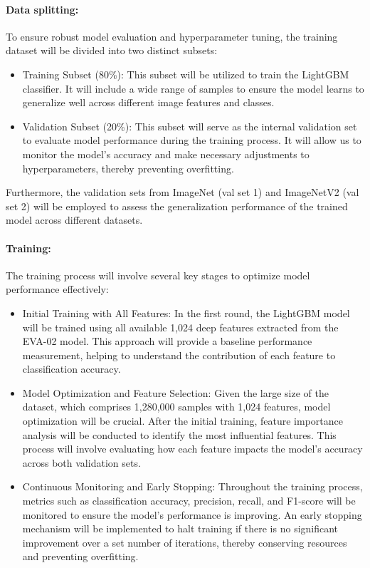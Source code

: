 \documentclass[a4paper,11pt]{article}
\begin{document}
\paragraph{Data splitting:}  
To ensure robust model evaluation and hyperparameter tuning, the training dataset will be divided into two distinct subsets:
\begin{itemize}
    \item Training Subset (80\%): This subset will be utilized to train the LightGBM classifier. It will include a wide range of samples to ensure the model learns to generalize well across different image features and classes.
    \item Validation Subset (20\%): This subset will serve as the internal validation set to evaluate model performance during the training process. It will allow us to monitor the model's accuracy and make necessary adjustments to hyperparameters, thereby preventing overfitting. 
\end{itemize}
Furthermore, the validation sets from ImageNet (val set 1) and ImageNetV2 (val set 2) will be employed to assess the generalization performance of the trained model across different datasets.

\paragraph{Training:}  
The training process will involve several key stages to optimize model performance effectively:
\begin{itemize}
    \item Initial Training with All Features: In the first round, the LightGBM model will be trained using all available 1,024 deep features extracted from the EVA-02 model. This approach will provide a baseline performance measurement, helping to understand the contribution of each feature to classification accuracy.
    \item Model Optimization and Feature Selection: Given the large size of the dataset, which comprises 1,280,000 samples with 1,024 features, model optimization will be crucial. After the initial training, feature importance analysis will be conducted to identify the most influential features. This process will involve evaluating how each feature impacts the model's accuracy across both validation sets.
    \item Continuous Monitoring and Early Stopping: Throughout the training process, metrics such as classification accuracy, precision, recall, and F1-score will be monitored to ensure the model's performance is improving. An early stopping mechanism will be implemented to halt training if there is no significant improvement over a set number of iterations, thereby conserving resources and preventing overfitting.
\end{itemize}
\end{document}
